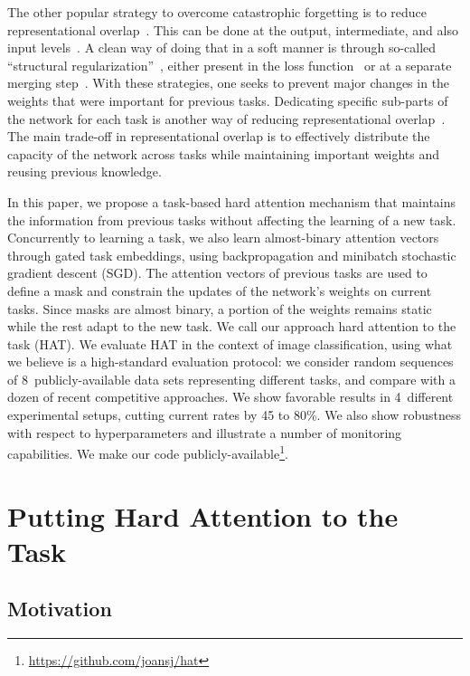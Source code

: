 The other popular strategy to overcome catastrophic forgetting is to reduce representational overlap~\cite{French91CCS}. This can be done at the output, intermediate, and also input levels~\cite{Gutsein15IJCNN,He18ICLR}. A clean way of doing that in a soft manner is through so-called ``structural regularization''~\cite{Zenke17ICML}, either present in the loss function~\cite{Kirkpatrick17PNAS,Zenke17ICML} or at a separate merging step~\cite{Lee17NIPS}. With these strategies, one seeks to prevent major changes in the weights that were important for previous tasks. Dedicating specific sub-parts of the network for each task is another way of reducing representational overlap~\cite{Rusu16ARXIV,Fernando17ARXIV,Yoon18ICLR}. The main trade-off in representational overlap is to effectively distribute the capacity of the network across tasks while maintaining important weights and reusing previous knowledge. 



In this paper, we propose a task-based hard attention mechanism that maintains the information from previous tasks without affecting the learning of a new task. Concurrently to learning a task, we also learn almost-binary attention vectors through gated task embeddings, using backpropagation and minibatch stochastic gradient descent (SGD). The attention vectors of previous tasks are used to define a mask and constrain the updates of the network's weights on current tasks. Since masks are almost binary, a portion of the weights remains static while the rest adapt to the new task. We call our approach hard attention to the task (HAT).
We evaluate HAT in the context of image classification, using what we believe is a high-standard evaluation protocol: we consider random sequences of 8~publicly-available data sets representing different tasks, and compare with a dozen of recent competitive approaches. We show favorable results in 4~different experimental setups, cutting current rates by 45 to 80\%. We also show robustness with respect to hyperparameters and illustrate a number of monitoring capabilities. We make our code publicly-available\footnote{\url{https://github.com/joansj/hat}}.





\section{Putting Hard Attention to the Task}
\label{sec:Method}

\subsection{Motivation}
\label{sec:Method_Motiv}

